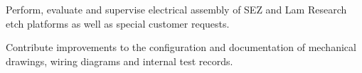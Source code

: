 \begin{tightemize}
    \item Perform, evaluate and supervise electrical assembly of SEZ and Lam Research etch platforms as well as special customer requests.
    \item Contribute improvements to the configuration and documentation of mechanical drawings, wiring diagrams and internal test records.
\end{tightemize}